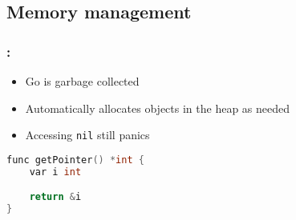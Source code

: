 \subsection{Memory management}

\begin{frame}[fragile]
    \frametitle{\secname: \small\subsecname\normalsize}

    \begin{itemize}
        \item Go is garbage collected
        \item Automatically allocates objects in the heap as needed
        \item Accessing \texttt{nil} still panics
    \end{itemize}

    \small \begin{lstlisting}[language=c]
func getPointer() *int {
    var i int

    return &i
}
    \end{lstlisting} \normalsize
\end{frame}
